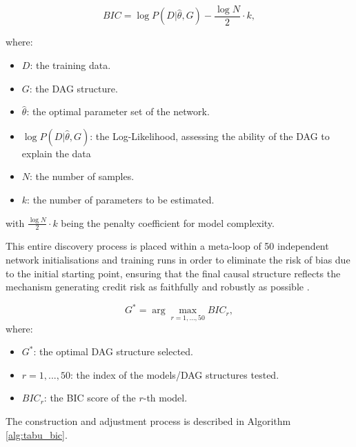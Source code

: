 \begin{equation}
    BIC = \log P(D|\hat{\theta},G) - \frac{\log N}{2}\cdot k,
\end{equation}

\noindent
where:

\begin{itemize}
    \item \(D\): the training data.
    \item \(G\): the DAG structure.
    \item \(\hat{\theta}\): the optimal parameter set of the network.
    \item \(\log P(D|\hat{\theta},G)\): the Log-Likelihood, assessing the ability of the DAG to explain the data 
    \item \(N\): the number of samples.
    \item \(k\): the number of parameters to be estimated.
\end{itemize}
with $\frac{\log N}{2}\cdot k$ being the penalty coefficient for model complexity.

\vspace{1em}
This entire discovery process is placed within a meta-loop of 50 independent network initialisations and training runs in order to eliminate the risk of bias due to the initial starting point, ensuring that the final causal structure reflects the mechanism generating credit risk as faithfully and robustly as possible \cite{liu2024credit}. 

\begin{equation}
G^* = \arg\max_{r=1,...,50} BIC_r,
\end{equation}
where:

\begin{itemize}
    \item $G^*$: the optimal DAG structure selected.
    \item $r = 1,...,50$: the index of the models/DAG structures tested.
    \item $BIC_r$: the BIC score of the $r$-th model.
\end{itemize}

\vspace{1em}
\noindent

The construction and adjustment process is described in Algorithm \ref{alg:tabu_bic}.


